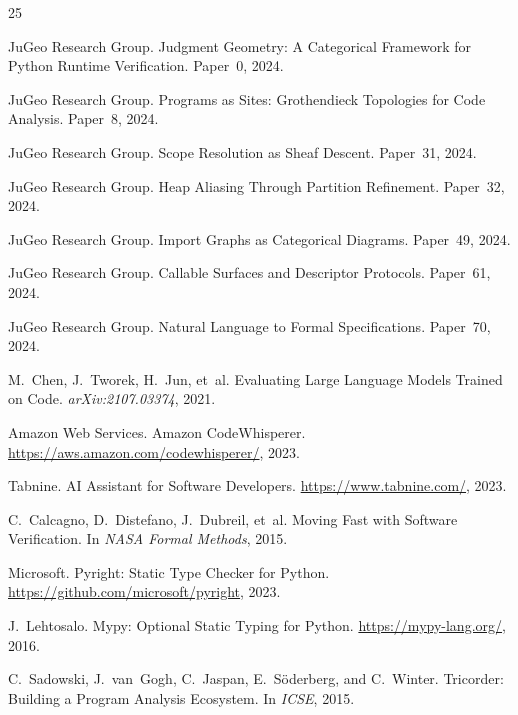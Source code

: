 \documentclass[11pt]{article}
\begin{document}
\begin{thebibliography}{25}

JuGeo Research Group.
\newblock Judgment Geometry: A Categorical Framework for Python Runtime
  Verification.
\newblock Paper~0, 2024.

JuGeo Research Group.
\newblock Programs as Sites: Grothendieck Topologies for Code Analysis.
\newblock Paper~8, 2024.

JuGeo Research Group.
\newblock Scope Resolution as Sheaf Descent.
\newblock Paper~31, 2024.

JuGeo Research Group.
\newblock Heap Aliasing Through Partition Refinement.
\newblock Paper~32, 2024.

JuGeo Research Group.
\newblock Import Graphs as Categorical Diagrams.
\newblock Paper~49, 2024.

JuGeo Research Group.
\newblock Callable Surfaces and Descriptor Protocols.
\newblock Paper~61, 2024.

JuGeo Research Group.
\newblock Natural Language to Formal Specifications.
\newblock Paper~70, 2024.

M.~Chen, J.~Tworek, H.~Jun, et~al.
\newblock Evaluating Large Language Models Trained on Code.
\newblock \emph{arXiv:2107.03374}, 2021.

Amazon Web Services.
\newblock Amazon CodeWhisperer.
\newblock \url{https://aws.amazon.com/codewhisperer/}, 2023.

Tabnine.
\newblock AI Assistant for Software Developers.
\newblock \url{https://www.tabnine.com/}, 2023.

C.~Calcagno, D.~Distefano, J.~Dubreil, et~al.
\newblock Moving Fast with Software Verification.
\newblock In \emph{NASA Formal Methods}, 2015.

Microsoft.
\newblock Pyright: Static Type Checker for Python.
\newblock \url{https://github.com/microsoft/pyright}, 2023.

J.~Lehtosalo.
\newblock Mypy: Optional Static Typing for Python.
\newblock \url{https://mypy-lang.org/}, 2016.

C.~Sadowski, J.~van~Gogh, C.~Jaspan, E.~Söderberg, and C.~Winter.
\newblock Tricorder: Building a Program Analysis Ecosystem.
\newblock In \emph{ICSE}, 2015.


\end{thebibliography}
\end{document}
